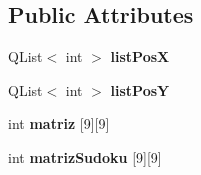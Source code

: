 \subsection*{Public Attributes}
\begin{DoxyCompactItemize}
\item 
\hypertarget{classsudoku_afde53a179f11c54b772a8723929b3a7b}{Q\-List$<$ int $>$ {\bfseries list\-Pos\-X}}\label{classsudoku_afde53a179f11c54b772a8723929b3a7b}

\item 
\hypertarget{classsudoku_a26df7ff7d6715034015c965ddb8c9c5e}{Q\-List$<$ int $>$ {\bfseries list\-Pos\-Y}}\label{classsudoku_a26df7ff7d6715034015c965ddb8c9c5e}

\item 
\hypertarget{classsudoku_ae0cee3e3b8b57d8ac65a9d0f88201ea6}{int {\bfseries matriz} \mbox{[}9\mbox{]}\mbox{[}9\mbox{]}}\label{classsudoku_ae0cee3e3b8b57d8ac65a9d0f88201ea6}

\item 
\hypertarget{classsudoku_a75b7e268f5cd8124fa4455081a5a2941}{int {\bfseries matriz\-Sudoku} \mbox{[}9\mbox{]}\mbox{[}9\mbox{]}}\label{classsudoku_a75b7e268f5cd8124fa4455081a5a2941}

\end{DoxyCompactItemize}


